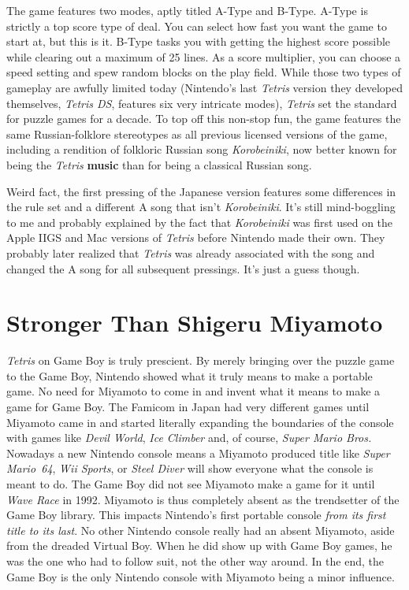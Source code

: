 \documentclass{book}
\begin{document}
The game features two modes, aptly titled A-Type and B-Type. A-Type is strictly a top score type of deal. You can select how fast you want the game to start at, but this is it. B-Type tasks you with getting the highest score possible while clearing out a maximum of 25 lines. As a score multiplier, you can choose a speed setting and spew random blocks on the play field. While those two types of gameplay are awfully limited today (Nintendo’s last \emph{Tetris} version they developed themselves, \emph{Tetris DS}, features six very intricate modes), \emph{Tetris} set the standard for puzzle games for a decade. To top off this non-stop fun, the game features the same Russian-folklore stereotypes as all previous licensed versions of the game, including a rendition of folkloric Russian song \emph{Korobeiniki}, now better known for being the \emph{Tetris} \textbf{music} than for being a classical Russian song.

Weird fact, the first pressing of the Japanese version features some differences in the rule set and a different A song that isn’t \emph{Korobeiniki}. It’s still mind-boggling to me and probably explained by the fact that \emph{Korobeiniki} was first used on the Apple IIGS and Mac versions of \emph{Tetris} before Nintendo made their own. They probably later realized that \emph{Tetris} was already associated with the song and changed the A song for all subsequent pressings. It’s just a guess though.

\FloatBarrier\needspace{10mm}\section*{Stronger Than Shigeru Miyamoto}\nopagebreak[4]

\emph{Tetris} on Game Boy is truly prescient. By merely bringing over the puzzle game to the Game Boy, Nintendo showed what it truly means to make a portable game. No need for Miyamoto to come in and invent what it means to make a game for Game Boy. The Famicom in Japan had very different games until Miyamoto came in and started literally expanding the boundaries of the console with games like \emph{Devil World}, \emph{Ice Climber} and, of course, \emph{Super Mario Bros.} Nowadays a new Nintendo console means a Miyamoto produced title like \emph{Super Mario~64}, \emph{Wii Sports}, or \emph{Steel Diver} will show everyone what the console is meant to do. The Game Boy did not see Miyamoto make a game for it until \emph{Wave Race} in 1992. Miyamoto is thus completely absent as the trendsetter of the Game Boy library. This impacts Nintendo’s first portable console \emph{from its first title to its last}. No other Nintendo console really had an absent Miyamoto, aside from the dreaded Virtual Boy. When he did show up with Game Boy games, he was the one who had to follow suit, not the other way around. In the end, the Game Boy is the only Nintendo console with Miyamoto being a minor influence.
\end{document}

